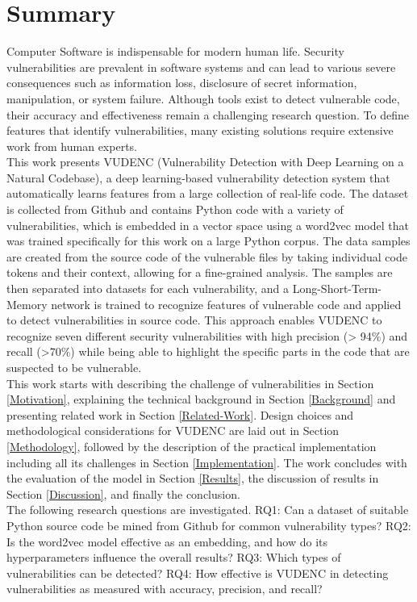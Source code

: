 \documentclass[
a4paper,
pagesize,
pdftex,
12pt,
twoside, %
BCOR=5mm, %
ngerman,
fleqn,
final,
]{scrartcl}
\begin{document}
	\section{Summary}
	Computer Software is indispensable for modern human life. Security vulnerabilities are prevalent in software systems and can lead to various severe consequences such as information loss, disclosure of secret information, manipulation, or system failure. Although tools exist to detect vulnerable code, their accuracy and effectiveness remain a challenging research question. To define features that identify vulnerabilities, many existing solutions require extensive work from human experts.\\ %
	This work presents VUDENC (Vulnerability Detection with Deep Learning on a Natural Codebase), a deep learning-based vulnerability detection system that automatically learns features from a large collection of real-life code. The dataset is collected from Github and contains Python code with a variety of vulnerabilities, which is embedded in a vector space using a word2vec model that was trained specifically for this work on a large Python corpus. The data samples are created from the source code of the vulnerable files by taking individual code tokens and their context, allowing for a fine-grained analysis. The samples are then separated into datasets for each vulnerability, and a Long-Short-Term-Memory network is trained to recognize features of vulnerable code and applied to detect vulnerabilities in source code. This approach enables VUDENC to recognize seven different security vulnerabilities with high precision (> 94\%) and recall (>70\%) while being able to highlight the specific parts in the code that are suspected to be vulnerable.\\	
	This work starts with describing the challenge of vulnerabilities in Section \ref{Motivation}, explaining the technical background in Section \ref{Background} and presenting related work in Section \ref{Related-Work}. Design choices and methodological considerations for VUDENC are laid out in Section \ref{Methodology}, followed by the description of the practical implementation including all its challenges in Section \ref{Implementation}. The work concludes with the evaluation of the model in Section \ref{Results}, the discussion of results in Section \ref{Discussion}, and finally the conclusion.\\	
	The following research questions are investigated. RQ1: Can a dataset of suitable Python source code be mined from Github for common vulnerability types? RQ2: Is the word2vec model effective as an embedding, and how do its hyperparameters influence the overall results? RQ3: Which types of vulnerabilities can be detected? RQ4: How effective is VUDENC in detecting vulnerabilities as measured with accuracy, precision, and recall? \\
	
\end{document}
